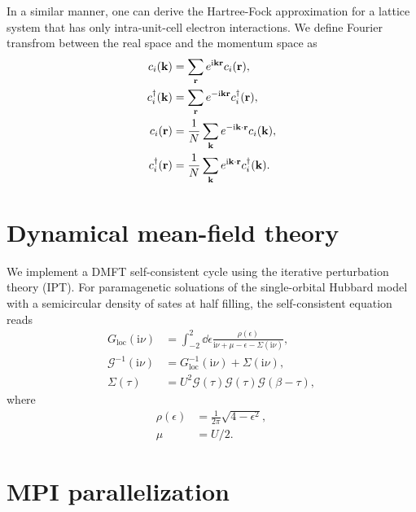 \documentclass[submission, LectureNotes]{SciPost}
\newcommand{\bk}{\ensuremath{{\bf k}}}
\newcommand{\br}{\ensuremath{{\bf r}}}
\newcommand\ii{\mathrm{i}}%
\newcommand\iv{\ii\nu}%
\begin{document}
In a similar manner, one can derive the Hartree-Fock approximation for a lattice system that
has only intra-unit-cell electron interactions.
We define Fourier transfrom between the real space and the momentum space as
\begin{align}
    c_i(\bk) &=  \sum_{\bf r} e^{\ii {\bf k} {\bf r}} c_i({\bf r}),\\
    c^\dagger_i(\bk) &=  \sum_{\bf r} e^{-\ii {\bf k} {\bf r}} c^\dagger_i({\bf r}),\\
    c_i(\br) &= \frac{1}{{N}} \sum_\bk e^{-\ii \bk\cdot\br} c_i(\bk),\\
    c^\dagger_i(\br) &= \frac{1}{{N}} \sum_\bk e^{\ii \bk\cdot\br} c^\dagger_i(\bk).
\end{align}


\clearpage
\section{Dynamical mean-field theory}
We implement a DMFT self-consistent cycle using the iterative perturbation theory (IPT).
For paramagenetic soluations of the single-orbital Hubbard model with a semicircular density of sates at half filling,
the self-consistent equation reads
\begin{align}
    G_\mathrm{loc}(\iv) &= \int_{-2}^2 \dd \epsilon \frac{\rho(\epsilon)}{\iv + \mu - \epsilon - \Sigma(\iv)},\\
    \mathcal{G}^{-1}(\iv) &= G_\mathrm{loc}^{-1}(\iv) + \Sigma(\iv),\\
    \Sigma(\tau) &= U^2 \mathcal{G}(\tau) \mathcal{G}(\tau) \mathcal{G}(\beta-\tau),
\end{align}
where
\begin{align}
    \rho(\epsilon) &= \frac{1}{2\pi}\sqrt{4-\epsilon^2},\\
    \mu &= U/2.
\end{align}

\clearpage
\section{MPI parallelization}

\begin{appendix}
\end{appendix}



\nolinenumbers
\end{document}
